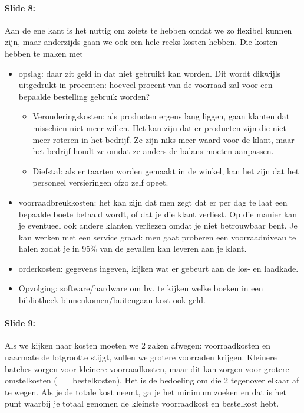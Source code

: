 \documentclass[10pt,a4paper]{report}
\begin{document}
\paragraph{Slide 8:} Aan de ene kant is het nuttig om zoiets te hebben omdat we zo flexibel kunnen zijn, maar anderzijds gaan we ook een hele reeks kosten hebben. Die kosten hebben te maken met
\begin{itemize}
\item opslag: daar zit geld in dat niet gebruikt kan worden. Dit wordt dikwijls uitgedrukt in procenten: hoeveel procent van de voorraad zal voor een bepaalde bestelling gebruik worden?
\begin{itemize}
\item Verouderingskosten: als producten ergens lang liggen, gaan klanten dat misschien niet meer willen. Het kan zijn dat er producten zijn die niet meer roteren in het bedrijf. Ze zijn niks meer waard voor de klant, maar het bedrijf houdt ze omdat ze anders de balans moeten aanpassen.
\item Diefstal: als er taarten worden gemaakt in de winkel, kan het zijn dat het personeel versieringen ofzo zelf opeet.
\end{itemize}
\item voorraadbreukkosten: het kan zijn dat men zegt dat er per dag te laat een bepaalde boete betaald wordt, of dat je die klant verliest. Op die manier kan je eventueel ook andere klanten verliezen omdat je niet betrouwbaar bent. Je kan werken met een service graad: men gaat proberen een voorraadniveau te halen zodat je in 95\% van de gevallen kan leveren aan je klant.
\item orderkosten: gegevens ingeven, kijken wat er gebeurt aan de los- en laadkade.
\item Opvolging: software/hardware om bv. te kijken welke boeken in een bibliotheek binnenkomen/buitengaan kost ook geld.
\end{itemize}

\paragraph{Slide 9:} Als we kijken naar kosten moeten we 2 zaken afwegen: voorraadkosten en naarmate de lotgrootte stijgt, zullen we grotere voorraden krijgen. Kleinere batches zorgen voor kleinere voorraadkosten, maar dit kan zorgen voor grotere omstelkosten (== bestelkosten). Het is de bedoeling om die 2 tegenover elkaar af te wegen. Als je de totale kost neemt, ga je het minimum zoeken en dat is het punt waarbij je totaal genomen de kleinste voorraadkost en bestelkost hebt. 
\end{document}
